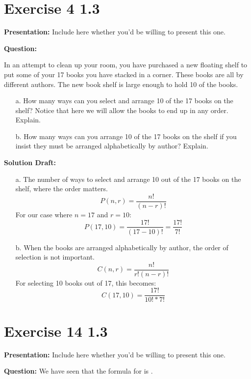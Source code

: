 \documentclass{article}
\begin{document}
\section*{Exercise 4 1.3}  

\noindent\textbf{Presentation:} Include here whether you'd be willing to present this one. 

\vspace{0.5cm} %
\noindent\textbf{Question:} 



In an attempt to clean up your room, you have purchased a new floating shelf to put some of your 17 books you have stacked in a corner. These books are all by different authors. The new book shelf is large enough to hold 10 of the books.
\begin{enumerate}
    \item[a.]How many ways can you select and arrange 10 of the 17 books on the shelf? Notice that here we will allow the books to end up in any order. Explain.

    \item[b.]How many ways can you arrange 10 of the 17 books on the shelf if you insist they must be arranged alphabetically by author? Explain.
\end{enumerate}

\noindent\textbf{Solution Draft:} 
\begin{enumerate}

\item[a.]The number of ways to select and arrange 10 out of the 17 books on the shelf, where the order matters.
\[
P(n, r) = \frac{n!}{(n-r)!}
\]
For our case where \( n = 17 \) and \( r = 10 \):
\[
P(17, 10) = \frac{17!}{(17-10)!} = \frac{17!}{7!}
\]

\item[b.]When the books are arranged alphabetically by author, the order of selection is not important.
\[
C(n, r) = \frac{n!}{r!(n-r)!}
\]
For selecting 10 books out of 17, this becomes:
\[
C(17, 10) = \frac{17!}{10! * 7!}
\]
\end{enumerate}
\section*{Exercise 14 1.3}  

\noindent\textbf{Presentation:} Include here whether you'd be willing to present this one. 

\vspace{0.5cm} %
\noindent\textbf{Question:} 
We have seen that the formula for is
.
\end{document}

